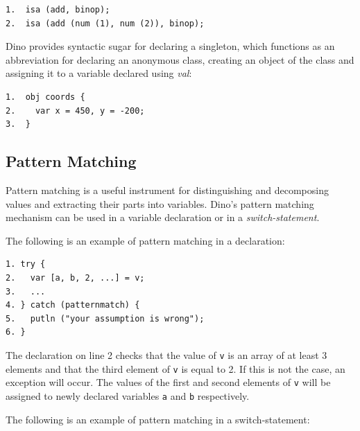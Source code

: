 \documentclass[preprint]{sigplanconf}
\begin{document}
{\footnotesize
\begin{verbatim}
1.  isa (add, binop);
2.  isa (add (num (1), num (2)), binop);
\end{verbatim}
}

Dino provides syntactic sugar for declaring a singleton, which functions as
an abbreviation for declaring an anonymous class, creating an object of the class
and assigning it to a variable declared using \emph{val}:

{\footnotesize
\begin{verbatim}
1.  obj coords {
2.    var x = 450, y = -200;
3.  }
\end{verbatim}
}

\subsection{Pattern Matching}

Pattern matching is a useful instrument for distinguishing and decomposing
values and extracting their parts into variables.
Dino's pattern matching mechanism can
be used in a variable declaration or in a \emph{switch-statement}.

The following is an example of pattern matching in a declaration:

{\footnotesize
\begin{verbatim}
1. try {
2.   var [a, b, 2, ...] = v;
3.   ...
4. } catch (patternmatch) {
5.   putln ("your assumption is wrong");
6. }
\end{verbatim}
}

The declaration on line 2 checks that the value of {\tt v} is an array of at
least 3 elements and that the third element of {\tt v} is equal to 2.  If this
is not the case, an exception will occur.
The values of the first and second elements of {\tt v} will be assigned to newly declared variables {\tt a} and {\tt b} respectively.

The following is an example of pattern matching in a switch-statement:
\end{document}
